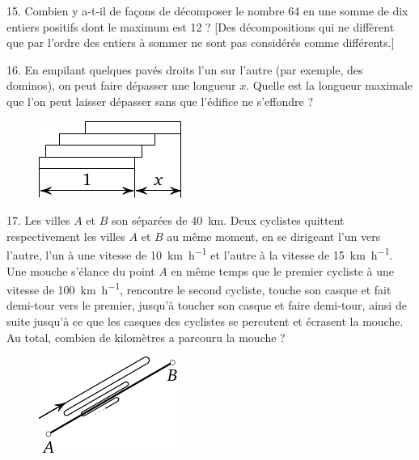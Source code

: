 \begin{problem}{15.}
	Combien y a-t-il de façons de décomposer le nombre 64 en une somme de dix entiers positifs dont
	le maximum est 12 ?
	[Des décompositions qui ne diffèrent que par l'ordre des entiers à sommer ne sont pas considérés 
	comme différents.]
\end{problem}

\begin{problem}{16.}
	En empilant quelques pavés droits l'un sur l'autre (par exemple, des dominos),
	on peut faire dépasser une longueur $x$.
	Quelle est la longueur maximale que l'on peut laisser dépasser sans que l'édifice ne s'effondre ?
	\begin{figure}
		\includegraphics{resources/taskbook-97}
	\end{figure}
\end{problem}

\begin{problem}{17.}
	Les villes $A$ et $B$ son séparées de \SI{40}{\km}. 
	Deux cyclistes quittent respectivement les villes $A$ et $B$ au même moment,
	en se dirigeant l'un vers l'autre, l'un à une vitesse de 
	\SI{10}{\km\per\hour} et l'autre à la vitesse de \SI{15}{\km\per\hour}. 
	Une mouche s'élance du point $A$ en même temps que le premier cycliste à une
	vitesse de \SI{100}{\km\per\hour}, rencontre le second cycliste,
	touche son casque et fait demi-tour vers le premier, jusqu'à toucher son 
	casque et faire demi-tour, ainsi de suite jusqu'à ce que les casques des 
	cyclistes se percutent et écrasent la mouche.
	Au total, combien de kilomètres a parcouru la mouche ?
	\begin{figure}
		\includegraphics{resources/taskbook-1}
	\end{figure}
\end{problem}

